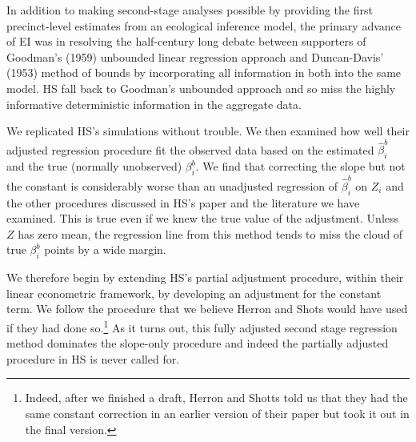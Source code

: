 \documentclass[11pt,titlepage]{article}
\begin{document}
In addition to making second-stage analyses possible by providing the
first precinct-level estimates from an ecological inference model, the
primary advance of EI was in resolving the half-century long debate
between supporters of Goodman's (1959) unbounded linear regression
approach and Duncan-Davis' (1953) method of bounds by incorporating
all information in both into the same model.  HS fall back to
Goodman's unbounded approach and so miss the highly informative
deterministic information in the aggregate data.

We replicated HS's simulations without trouble.  We then examined how
well their adjusted regression procedure fit the observed data based
on the estimated $\hat\beta_i^b$ and the true (normally unobserved)
$\beta_i^b$.  We find that correcting the slope but not the constant
is considerably worse than an unadjusted regression of $\hat\beta_i^b$
on $Z_i$ and the other procedures discussed in HS's paper and the
literature we have examined.  This is true even if we knew the true
value of the adjustment.  Unless $Z$ has zero mean, the regression
line from this method tends to miss the cloud of true $\beta_i^b$
points by a wide margin.

We therefore begin by extending HS's partial adjustment procedure,
within their linear econometric framework, by developing an adjustment
for the constant term.  We follow the procedure that we believe Herron
and Shots would have used if they had done so.\footnote{Indeed, after
  we finished a draft, Herron and Shotts told us that they had the
  same constant correction in an earlier version of their paper but
  took it out in the final version.}  As it turns out, this fully
adjusted second stage regression method dominates the slope-only
procedure and indeed the partially adjusted procedure in HS is never
called for.
\end{document}
